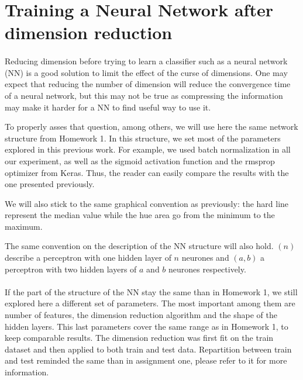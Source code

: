 \documentclass[twocolumn,a4paper,10pt]{article}
\begin{document}
\section{Training a Neural Network after dimension reduction} \label{nn}
\paragraph{}
Reducing dimension before trying to learn a classifier such as a neural network (NN) is a good solution to limit the effect of the curse of dimensions. One may expect that reducing the number of dimension will reduce the convergence time of a neural network, but this may not be true as compressing the information may make it harder for a NN to find useful way to use it.

To properly asses that question, among others, we will use here the same network structure from Homework 1. In this structure, we set most of the parameters explored in this previous work. For example, we used batch normalization in all our experiment, as well as the sigmoid activation function and the rmsprop optimizer from Keras. Thus, the reader can easily compare the results with the one presented previously.

We will also stick to the same graphical convention as previously: the hard line represent the median value while the hue area go from the minimum to the maximum.

The same convention on the description of the NN structure will also hold. $(n)$ describe a perceptron with one hidden layer of $n$ neurones and $(a,b)$ a perceptron with two hidden layers of $a$ and $b$ neurones respectively.

\paragraph{}
If the part of the structure of the NN stay the same than in Homework 1, we still explored here a different set of parameters. The most important among them are number of features, the dimension reduction algorithm and the shape of the hidden layers. This last parameters cover the same range as in Homework 1, to keep comparable results. The dimension reduction was first fit on the train dataset and then applied to both train and test data. Repartition between train and test reminded the same than in assignment one, please refer to it for more information.
\end{document}
